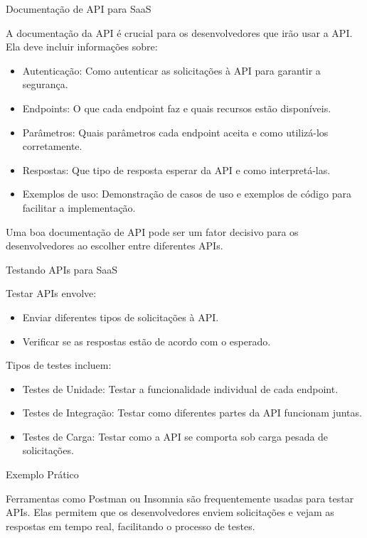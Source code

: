 \documentclass{beamer}
\begin{document}
\begin{frame}{Documentação de API para SaaS}

	A documentação da API é crucial para os desenvolvedores que irão usar a API. Ela deve incluir informações sobre:

	\begin{itemize}
		\item Autenticação: Como autenticar as solicitações à API para garantir a segurança.
		\item Endpoints: O que cada endpoint faz e quais recursos estão disponíveis.
		\item Parâmetros: Quais parâmetros cada endpoint aceita e como utilizá-los corretamente.
		\item Respostas: Que tipo de resposta esperar da API e como interpretá-las.
		\item Exemplos de uso: Demonstração de casos de uso e exemplos de código para facilitar a implementação.
	\end{itemize}

	Uma boa documentação de API pode ser um fator decisivo para os desenvolvedores ao escolher entre diferentes APIs.

\end{frame}

\begin{frame}{Testando APIs para SaaS}

	Testar APIs envolve:

	\begin{itemize}
		\item Enviar diferentes tipos de solicitações à API.
		\item Verificar se as respostas estão de acordo com o esperado.
	\end{itemize}

	Tipos de testes incluem:

	\begin{itemize}
		\item Testes de Unidade: Testar a funcionalidade individual de cada endpoint.
		\item Testes de Integração: Testar como diferentes partes da API funcionam juntas.
		\item Testes de Carga: Testar como a API se comporta sob carga pesada de solicitações.
	\end{itemize}

\end{frame}

\begin{frame}{Exemplo Prático}

	Ferramentas como Postman ou Insomnia são frequentemente usadas para testar APIs. Elas permitem que os desenvolvedores enviem solicitações e vejam as respostas em tempo real, facilitando o processo de testes.

\end{frame}
\end{document}
